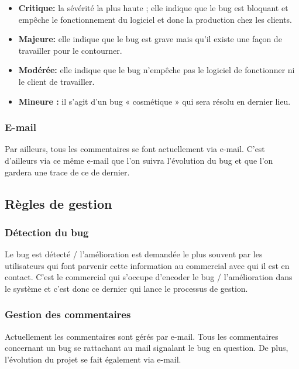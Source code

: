\documentclass{article}[12pt]
\begin{document}
\begin{itemize}
	\item \textbf{Critique:} la sévérité la plus haute ; elle indique que le bug est bloquant et empêche le fonctionnement du logiciel et donc la production chez les clients.
	\item \textbf{Majeure:} elle indique que le bug est grave mais qu'il existe une façon de travailler pour le contourner.
	\item \textbf{Modérée:} elle indique que le bug n'empêche pas le logiciel de fonctionner ni le client de travailler.
	\item \textbf{Mineure :} il s'agit d'un bug « cosmétique » qui sera résolu en dernier lieu.
\end{itemize}
\subsubsection{E-mail}
Par ailleurs, tous les commentaires se font actuellement via e-mail. C'est d'ailleurs via ce même e-mail que l'on suivra l'évolution du bug et que l'on gardera une trace de ce de dernier.

\subsection{Règles de gestion}

\subsubsection{Détection du bug}
Le bug est détecté / l'amélioration est demandée le plus souvent par les utilisateurs qui font parvenir cette information au commercial avec qui il est en contact. C'est le commercial qui s'occupe d'encoder le bug / l'amélioration dans le système et c'est donc ce dernier qui lance le processus de gestion.

\subsubsection{Gestion des commentaires}
Actuellement les commentaires sont gérés par e-mail. Tous les commentaires concernant un bug se rattachant au mail signalant le bug en question. De plus, l'évolution du projet se fait également via e-mail.
\end{document}
